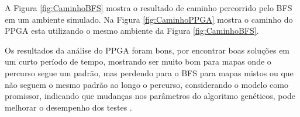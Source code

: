 A Figura \ref{fig:CaminhoBFS} mostra o resultado de caminho percorrido pelo BFS em um ambiente simulado. Na Figura \ref{fig:CaminhoPPGA} mostra o caminho do PPGA esta utilizando o mesmo ambiente da Figura \ref{fig:CaminhoBFS}.

\begin{minipage}{\linewidth}
	\label{fig:CaminhoBFS}
\end{minipage}

\begin{minipage}{\linewidth}
	\label{fig:CaminhoPPGA}
\end{minipage}

Os resultados da análise do PPGA foram bons, por encontrar boas soluções em um curto período de tempo, mostrando ser muito bom para mapas onde o percurso segue um padrão, mas perdendo para o BFS para mapas mistos ou que não seguem o mesmo padrão ao longo o percurso, considerando o modelo como promissor, indicando que mudanças nos parâmetros do algoritmo genéticos, pode melhorar o desempenho dos testes \cite{Ulysses}. 






